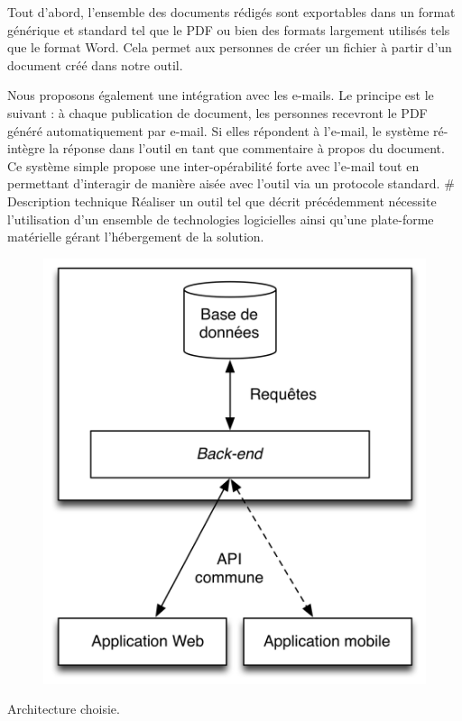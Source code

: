 \documentclass[10pt,twocolumn,a4paper,utf8x]{article}
\begin{document}
Tout d'abord, l'ensemble des documents rédigés sont exportables dans un
format générique et standard tel que le PDF ou bien des formats
largement utilisés tels que le format Word. Cela permet aux personnes de
créer un fichier à partir d'un document créé dans notre outil.

Nous proposons également une intégration avec les e-mails. Le principe
est le suivant : à chaque publication de document, les personnes
recevront le PDF généré automatiquement par e-mail. Si elles répondent à
l'e-mail, le système ré-intègre la réponse dans l'outil en tant que
commentaire à propos du document. Ce système simple propose une
inter-opérabilité forte avec l'e-mail tout en permettant d'interagir de
manière aisée avec l'outil via un protocole standard. \# Description
technique Réaliser un outil tel que décrit précédemment nécessite
l'utilisation d'un ensemble de technologies logicielles ainsi qu'une
plate-forme matérielle gérant l'hébergement de la solution.

\begin{figure}[htbp]
\centering
\includegraphics[width=\hsize]{architecture.png}
\end{figure}

Architecture choisie.
\end{document}
